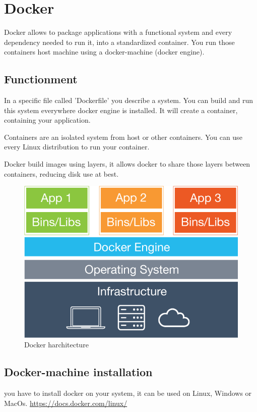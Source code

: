\documentclass[a4paper,11pt]{report}
\begin{document}
\section{Docker}
Docker allows to package applications with a functional system and every dependency needed to run it, into a standardized container. \cite{ref3} You run those containers host machine using a docker-machine (docker engine). 

\subsection{Functionment}
In a specific file called 'Dockerfile' you describe a system. You can build and run this system everywhere docker engine is installed. It will create a container, containing your application.

Containers are an isolated system from host or other containers. You can use every Linux distribution to run your container.

Docker build images using layers, it allows docker to share those layers between containers, reducing disk use at best.

\begin{figure}[H]
	\begin{center}
		\includegraphics[scale=0.35]{img/what-is-vm-diagram}
		\caption{Docker harchitecture}
	\end{center}
\end{figure}
\newpage
\subsection{Docker-machine installation}
you have to install docker on your system, it can be used on Linux, Windows or MacOs. \url{https://docs.docker.com/linux/}
\end{document}
